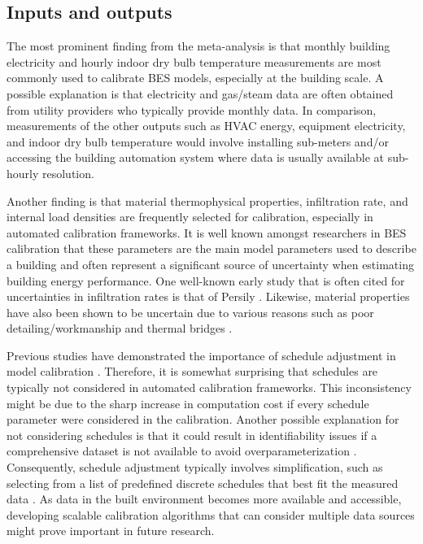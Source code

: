 \documentclass[review]{elsarticle}
\begin{document}
\subsection{Inputs and outputs}

The most prominent finding from the meta-analysis is that monthly building electricity and hourly indoor dry bulb temperature measurements are most commonly used to calibrate BES models, especially at the building scale. A possible explanation is that electricity and gas/steam data are often obtained from utility providers who typically provide monthly data. In comparison, measurements of the other outputs such as HVAC energy, equipment electricity, and indoor dry bulb temperature would involve installing sub-meters and/or accessing the building automation system where data is usually available at sub-hourly resolution.  

Another finding is that material thermophysical properties, infiltration rate, and internal load densities are frequently selected for calibration, especially in automated calibration frameworks. It is well known amongst researchers in BES calibration that these parameters are the main model parameters used to describe a building and often represent a significant source of uncertainty when estimating building energy performance. One well-known early study that is often cited for uncertainties in infiltration rates is that of Persily \cite{persily1998airtightness}. Likewise, material properties have also been shown to be uncertain due to various reasons such as poor detailing/workmanship and thermal bridges \cite{de2014gap, francis2015solid, gori2017inferring}. 

Previous studies have demonstrated the importance of schedule adjustment in model calibration \cite{kim2017building, chong2021occupancy}. Therefore, it is somewhat surprising that schedules are typically not considered in automated calibration frameworks. This inconsistency might be due to the sharp increase in computation cost if every schedule parameter were considered in the calibration. Another possible explanation for not considering schedules is that it could result in identifiability issues if a comprehensive dataset is not available to avoid overparameterization \cite{chong2018guidelines, yi2019parameter}. Consequently, schedule adjustment typically involves simplification, such as selecting from a list of predefined discrete schedules that best fit the measured data \cite{nagpal2019methodology, nagpal2019framework, krayem2019urban, chen2020automatic}. As data in the built environment becomes more available and accessible, developing scalable calibration algorithms that can consider multiple data sources might prove important in future research.
\end{document}
